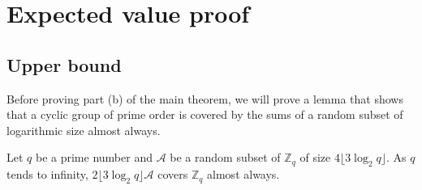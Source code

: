 \chapter{Expected value proof}\label{chap:expected_value_proof}


\section{Upper bound}\label{sec:results:upperbound}
Before proving part (b) of the main theorem, we will prove a lemma that shows that a cyclic group of prime order is covered by the sums of a random subset of logarithmic size almost always.
\begin{lemma}\label{lem:sumset}
    Let $q$ be a prime number and $\mathcal{A}$ be a random subset of $\mathbb{Z}_q$ of size $4\lfloor3\log_2 q\rfloor$. As $q$ tends to infinity, $2\lfloor3\log_2 q\rfloor \mathcal{A}$ covers $\mathbb{Z}_q$ almost always. 
\end{lemma}

